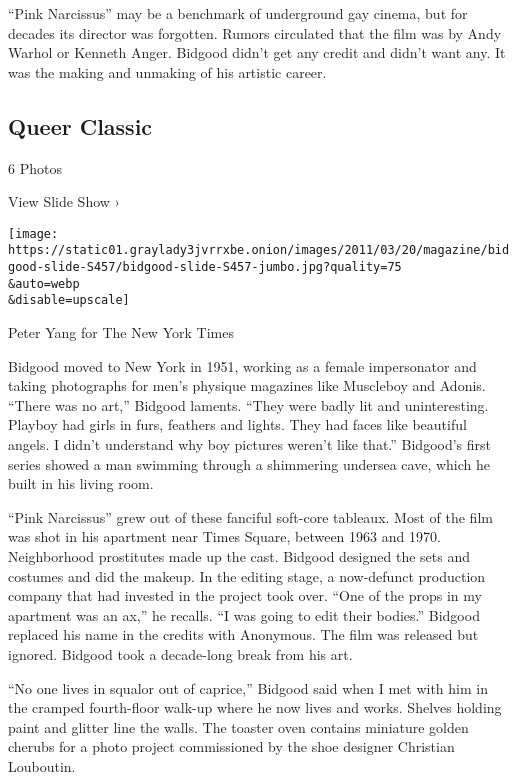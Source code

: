 ``Pink Narcissus'' may be a benchmark of underground gay cinema, but for
decades its director was forgotten. Rumors circulated that the film was
by Andy Warhol or Kenneth Anger. Bidgood didn't get any credit and
didn't want any. It was the making and unmaking of his artistic career.

\href{https://www.nytimes3xbfgragh.onion/slideshow/2011/03/20/magazine/bidgood.html}{}

\hypertarget{queer-classic}{%
\subsection{Queer Classic}\label{queer-classic}}

6 Photos

View Slide Show ›

\texttt{[image: https://static01.graylady3jvrrxbe.onion/images/2011/03/20/magazine/bidgood-slide-S457/bidgood-slide-S457-jumbo.jpg?quality=75\\\&auto=webp\\\&disable=upscale]}

Peter Yang for The New York Times

Bidgood moved to New York in 1951, working as a female impersonator and
taking photographs for men's physique magazines like Muscleboy and
Adonis. ``There was no art,'' Bidgood laments. ``They were badly lit and
uninteresting. Playboy had girls in furs, feathers and lights. They had
faces like beautiful angels. I didn't understand why boy pictures
weren't like that.'' Bidgood's first series showed a man swimming
through a shimmering undersea cave, which he built in his living room.

``Pink Narcissus'' grew out of these fanciful soft-core tableaux. Most
of the film was shot in his apartment near Times Square, between 1963
and 1970. Neighborhood prostitutes made up the cast. Bidgood designed
the sets and costumes and did the makeup. In the editing stage, a
now-defunct production company that had invested in the project took
over. ``One of the props in my apartment was an ax,'' he recalls. ``I
was going to edit their bodies.'' Bidgood replaced his name in the
credits with Anonymous. The film was released but ignored. Bidgood took
a decade-long break from his art.

``No one lives in squalor out of caprice,'' Bidgood said when I met with
him in the cramped fourth-floor walk-up where he now lives and works.
Shelves holding paint and glitter line the walls. The toaster oven
contains miniature golden cherubs for a photo project commissioned by
the shoe designer Christian Louboutin.

